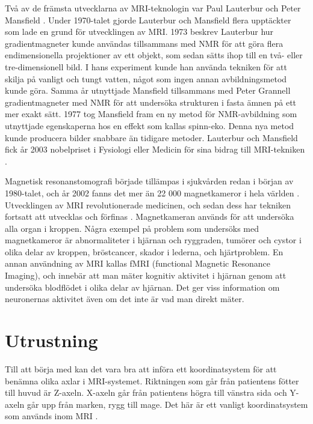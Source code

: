 \documentclass[11pt, a4paper]{article}
\begin{document}
Två av de främsta utvecklarna av MRI-teknologin var Paul Lauterbur och Peter Mansfield \parencite{mri_nobelpris_pressmeddelande}. Under 1970-talet gjorde Lauterbur och Mansfield flera upptäckter som lade en grund för utvecklingen av MRI. 1973 beskrev Lauterbur hur gradientmagneter kunde användas tillsammans med NMR för att göra flera endimensionella projektioner av ett objekt, som sedan sätts ihop till en två- eller tre-dimensionell bild. I hans experiment kunde han använda tekniken för att skilja på vanligt och tungt vatten, något som ingen annan avbildningsmetod kunde göra. Samma år utnyttjade Mansfield tillsammans med Peter Grannell gradientmagneter med NMR för att undersöka strukturen i fasta ämnen på ett mer exakt sätt. 1977 tog Mansfield fram en ny metod för NMR-avbildning som utnyttjade egenskaperna hos en effekt som kallas spinn-eko. Denna nya metod kunde producera bilder snabbare än tidigare metoder. Lauterbur och Mansfield fick år 2003 nobelpriset i Fysiologi eller Medicin för sina bidrag till MRI-tekniken \parencite{mri_nobelpris_pressmeddelande}.

Magnetisk resonanstomografi började tillämpas i sjukvården redan i början av 1980-talet, och år 2002 fanns det mer än 22 000 magnetkameror i hela världen \parencite{mri_nobelpris_pressmeddelande}. Utvecklingen av MRI revolutionerade medicinen, och sedan dess har tekniken fortsatt att utvecklas och förfinas \parencite{mri_facts}. Magnetkameran används för att undersöka alla organ i kroppen. Några exempel på problem som undersöks med magnetkameror är abnormaliteter i hjärnan och ryggraden, tumörer och cystor i olika delar av kroppen, bröstcancer, skador i lederna, och hjärtproblem. En annan användning av MRI kallas fMRI (functional Magnetic Resonance Imaging), och innebär att man mäter kognitiv aktivitet i hjärnan genom att undersöka blodflödet i olika delar av hjärnan. Det ger viss information om neuronernas aktivitet även om det inte är vad man direkt mäter.

\clearpage
\section{Utrustning}
Till att börja med kan det vara bra att införa ett koordinatsystem för att benämna olika axlar i MRI-systemet. Riktningen som går från patientens fötter till huvud är Z-axeln. X-axeln går från patientens högra till vänstra sida och Y-axeln går upp från marken, rygg till mage. Det här är ett vanligt koordinatsystem som används inom MRI \parencite{mri_for_radiologists}.
\end{document}
